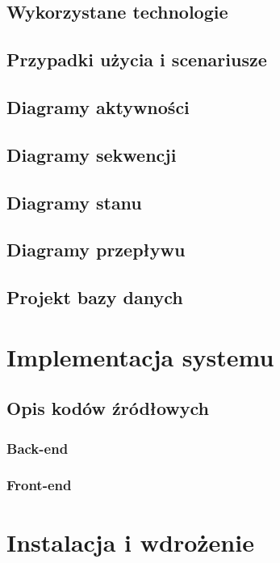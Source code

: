 \documentclass[10pt,titlepage]{article}
\begin{document}
\subsection{Wykorzystane technologie}
\subsection{Przypadki użycia i scenariusze}
\subsection{Diagramy aktywności}
\subsection{Diagramy sekwencji}
\subsection{Diagramy stanu}
\subsection{Diagramy przepływu}
\subsection{Projekt bazy danych}

\section{Implementacja systemu}
\subsection{Opis kodów źródłowych}
\subsubsection{Back-end}
\subsubsection{Front-end}

\section{Instalacja i wdrożenie}




\end{document}
